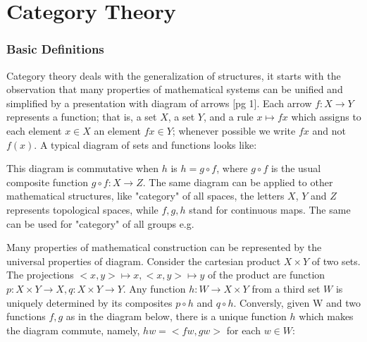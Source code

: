 \part{Category Theory}
\section*{Basic Definitions}


Category theory deals with the generalization of structures, it starts with the observation that many properties of mathematical systems can be unified and simplified by a presentation with diagram of arrows [pg 1]. Each arrow $f: X \to Y$ represents a function; that is, a set $X$, a set $Y$, and a rule $x \mapsto fx$ which assigns to each element $x \in X$ an element $fx \in Y$; whenever possible we write $fx$ and not $f(x)$. A typical diagram of sets and functions looks like: 
\begin{center}
\end{center}

This diagram is commutative when $h$ is $h = g \circ f$, where $g \circ f$ is the usual composite function $g \circ f: X \to Z$. The same diagram can be applied to other mathematical structures, like "category" of all spaces, the letters $X$, $Y$ and $Z$ represents topological spaces, while $f, g, h$ stand for continuous maps. The same can be used for "category" of all groups e.g.


Many properties of mathematical construction can be represented by the universal properties of diagram. Consider the cartesian product $X \times Y$ of two sets. The projections $<x,y> \mapsto x, <x, y> \mapsto y$ of the product are function $p: X \times Y \rightarrow X, q: X \times Y \rightarrow Y$. Any function $h: W \to X \times Y$ from a third set $W$ is uniquely determined by its composites $p \circ h$ and $q \circ h$. Conversly, given W and two functions $f, g$ as in the diagram below, there is a unique function $h$ which makes the diagram commute, namely, $hw = <fw, gw>$ for each $w \in W$:

\begin{center}
\end{center}

